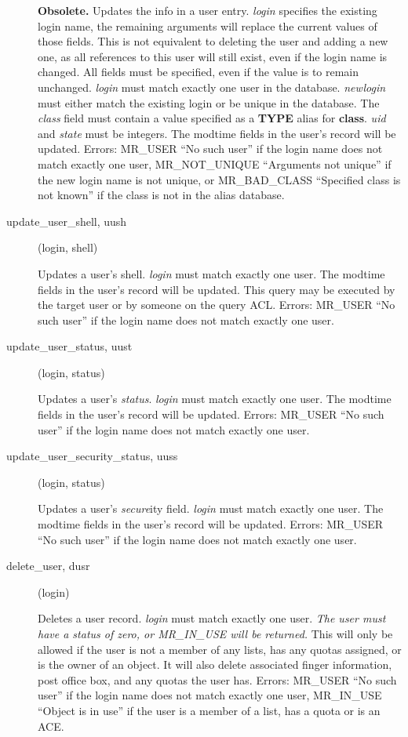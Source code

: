 \begin{description}
{\bf Obsolete.}  Updates the info in a user entry.  {\em login} specifies
the existing login name, the remaining arguments will replace the
current values of those fields.  This is not equivalent to deleting
the user and adding a new one, as all references to this user will
still exist, even if the login name is changed.  All fields must be
specified, even if the value is to remain unchanged.  {\em login} must
match exactly one user in the database.  {\em newlogin} must either
match the existing login or be unique in the database.  The {\em class}
field must contain a value specified as a {\bf TYPE} alias for
{\bf class}.  {\em uid} and {\em state} must be integers.  The modtime
fields in the user's record will be updated.  Errors: MR\_USER ``No such
user'' if the login name does not match exactly one user, MR\_NOT\_UNIQUE
``Arguments not unique'' if the new login name is not unique, or
MR\_BAD\_CLASS ``Specified class is not known'' if the class is not in the
alias database.

\item[update\_user\_shell, uush](login, shell)

Updates a user's shell.  {\em login} must match exactly one user.  The
modtime fields in the user's record will be updated.  This query may
be executed by the target user or by someone on the query ACL.
Errors: MR\_USER ``No such user'' if the login name does not match
exactly one user.

\item[update\_user\_status, uust](login, status)

Updates a user's {\em status}.  {\em login} must match exactly one user.
The modtime fields in the user's record will be updated.  Errors:
MR\_USER ``No such user'' if the login name does not match exactly one
user.

\item[update\_user\_security\_status, uuss](login, status)

Updates a user's {\em secure}ity field.  {\em login} must match exactly
one user.  The modtime fields in the user's record will be updated.
Errors: MR\_USER ``No such user'' if the login name does not match
exactly one user.

\item[delete\_user, dusr](login)

Deletes a user record. {\em login} must match exactly one user. {\em
The user must have a status of zero, or MR\_IN\_USE will be returned.}
This will only be allowed if the user is not a member of any lists,
has any quotas assigned, or is the owner of an object. It will also
delete associated finger information, post office box, and any quotas
the user has. Errors: MR\_USER ``No such user'' if the login name does
not match exactly one user, MR\_IN\_USE ``Object is in use'' if the user
is a member of a list, has a quota or is an ACE.


\end{description}
